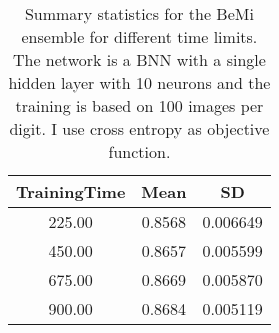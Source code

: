 \begin{center}
\begin{table}[H]
\centering
\begin{tabular}{|c|c|c|}
  \hline
TrainingTime & Mean & SD \\ 
  \hline
225.00 & 0.8568 & 0.006649 \\ 
   \hline
450.00 & 0.8657 & 0.005599 \\ 
   \hline
675.00 & 0.8669 & 0.005870 \\ 
   \hline
900.00 & 0.8684 & 0.005119 \\ 
   \hline
\end{tabular}
\caption{Summary statistics for the BeMi ensemble for different time limits. The
          network is a BNN with a single hidden layer with 10 neurons and the training is based on
          100 images per digit. I use cross entropy as objective function. } 
\label{BEMI_TIME}
\end{table}

\end{center}
